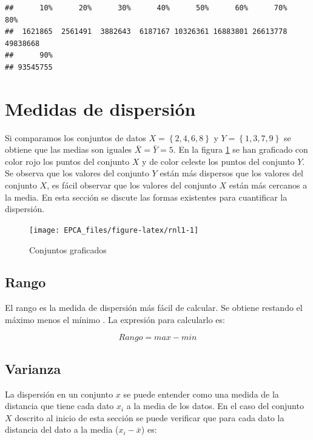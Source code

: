 \documentclass[letterpaper,]{book}
\begin{document}
\begin{verbatim}
##      10%      20%      30%      40%      50%      60%      70%      80% 
##  1621865  2561491  3882643  6187167 10326361 16883801 26613778 49838668 
##      90% 
## 93545755
\end{verbatim}

\hypertarget{dispersion}{%
\section{Medidas de dispersión}\label{dispersion}}

Si comparamos los conjuntos de datos \(X=\left\{ 2,4,6,8 \right\}\) y \(Y=\left\{1,3,7,9\right\}\) se obtiene que las medias son iguales \(\bar{X}= \bar{Y}=5\). En la figura \ref{fig:rnl1} se han graficado con color rojo los puntos del conjunto \(X\) y de color celeste los puntos del conjunto \(Y\). Se observa que los valores del conjunto \(Y\) están más dispersos que los valores del conjunto \(X\), es fácil observar que los valores del conjunto \(X\) están más cercanos a la media. En esta sección se discute las formas existentes para cuantificar la dispersión.

\begin{figure}[h!]

{\centering \texttt{[image: EPCA\_files/figure-latex/rnl1-1]} 

}

\caption{Conjuntos graficados}\label{fig:rnl1}
\end{figure}

\hypertarget{rango}{%
\subsection{Rango}\label{rango}}

El rango es la medida de dispersión más fácil de calcular. Se obtiene restando el máximo menos el mínimo \citep{groebner2018}. La expresión para calcularlo es:

\begin{equation} 
  Rango = max - min
  \label{eq:rg}
\end{equation}

\hypertarget{varianza}{%
\subsection{Varianza}\label{varianza}}

La dispersión en un conjunto \(x\) se puede entender como una medida de la distancia que tiene cada dato \(x_i\) a la media de los datos. En el caso del conjunto \(X\) descrito al inicio de esta sección se puede verificar que para cada dato la distancia del dato a la media (\(x_i-\bar{x}\)) es:
\end{document}
